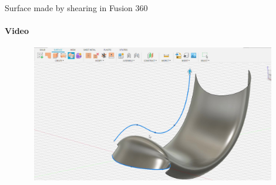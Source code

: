 \documentclass[aspectratio=169]{beamer}
\begin{document}
\begin{frame}[t]{Surface made by shearing in Fusion 360}
    \framesubtitle{Video}
    \vspace{-0.6cm}
    \begin{figure}[H]
        \href{run:./videos/sweep_surface_video.mp4}{
            \centering\includegraphics[height=6cm,width=1\textwidth,keepaspectratio]{sweep_surface_video_preview.jpg}}
    \end{figure}
\end{frame}
\end{document}
